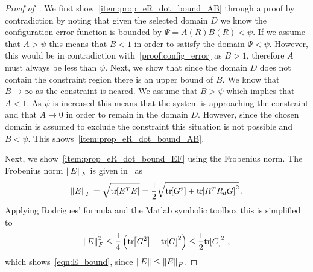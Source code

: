 \documentclass[letterpaper, 10 pt, conference]{ieeeconf}  %
\begin{document}
\begin{proof}[Proof of~]\label{proof:eR_dot_bound}
	We first show~\cref{item:prop_eR_dot_bound_AB} through a proof by contradiction by noting that given the selected domain \( D \) we know the configuration error function is bounded by \( \Psi = A(R) B(R) < \psi\).
	If we assume that \( A > \psi \) this means that \( B < 1 \) in order to satisfy the domain \( \Psi < \psi \).
	However, this would be in contradiction with~\cref{proof:config_error} as \( B > 1 \), therefore \( A \) must always be less than \( \psi \).
	Next, we show that since the domain \( D \) does not contain the constraint region there is an upper bound of \(B\).
	We know that \( B \to \infty \) as the constraint is neared. 
	We assume that \( B > \psi \) which implies that \( A < 1 \).
	As \( \psi \) is increased this means that the system is approaching the constraint and that \( A \to 0 \) in order to remain in the domain \( D \).
	However, since the chosen domain is assumed to exclude the constraint this situation is not possible and \( B < \psi \).
	This shows~\cref{item:prop_eR_dot_bound_AB}.
	
	Next, we show~\cref{item:prop_eR_dot_bound_EF} using the Frobenius norm.
	The Frobenius norm \( \left\| E \right\|_F \) is given in~\cite{lee2011a} as
	\begin{gather*}
		\left\| E \right\|_F = \sqrt{\mathrm{tr}\negthickspace\left[ E^T E \right]} = \frac{1}{2} \sqrt{\mathrm{tr}\negthickspace\left[ G^2 \right] + \mathrm{tr}\negthickspace\left[ R^T R_d G \right]^2} \, .
	\end{gather*}
	Applying Rodrigues' formula and the Matlab symbolic toolbox this is simplified to
	\begin{gather*}
		\left\| E \right\|^2_F \leq \frac{1}{4} \left( \mathrm{tr}\negthickspace\left[ G^2 \right] + \mathrm{tr}\negthickspace\left[ G \right]^2 \right) \leq \frac{1}{2} \mathrm{tr}\negthickspace\left[ G \right]^2 \, ,
	\end{gather*}
	which shows~\cref{eqn:E_bound}, since \( \left\| E \right\| \leq \left\| E \right\|_F \).
	

\end{proof}
\end{document}
